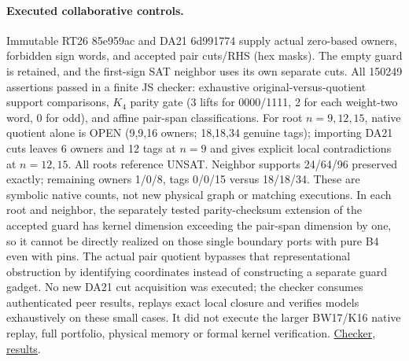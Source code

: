 \documentclass[11pt]{article}
\begin{document}
\paragraph{Executed collaborative controls.} Immutable RT26 85e959ac and DA21 6d991774 supply actual zero-based owners, forbidden sign words, and accepted pair cuts/RHS (hex masks). The empty guard is retained, and the first-sign SAT neighbor uses its own separate cuts. All 150249 assertions passed in a finite JS checker: exhaustive original-versus-quotient support comparisons, $K_4$ parity gate (3 lifts for 0000/1111, 2 for each weight-two word, 0 for odd), and affine pair-span classifications. For root $n=9,12,15$, native quotient alone is OPEN (9,9,16 owners; 18,18,34 genuine tags); importing DA21 cuts leaves 6 owners and 12 tags at $n=9$ and gives explicit local contradictions at $n=12,15$. All roots reference UNSAT. Neighbor supports 24/64/96 preserved exactly; remaining owners 1/0/8, tags 0/0/15 versus 18/18/34. These are symbolic native counts, not new physical graph or matching executions. In each root and neighbor, the separately tested parity-checksum extension of the accepted guard has kernel dimension exceeding the pair-span dimension by one, so it cannot be directly realized on those single boundary ports with pure B4 even with pins. The actual pair quotient bypasses that representational obstruction by identifying coordinates instead of constructing a separate guard gadget. No new DA21 cut acquisition was executed; the checker consumes authenticated peer results, replays exact local closure and verifies models exhaustively on these small cases. It did not execute the larger BW17/K16 native replay, full portfolio, physical memory or formal kernel verification. \href{https://github.com/j15marti/pnp/commit/c2643c9019b7bb45ced4a5e17deab666184506cf}{Checker}, \href{https://github.com/j15marti/pnp/commit/cbb0e2c61e3114ca9ba20a36f09018380724949d}{results}.
\end{document}
